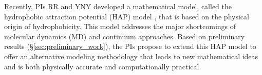 Recently, PIs RR and YNY developed a mathematical model, called the
hydrophobic attraction potential (HAP) model \cite{Fu2018_SIAM}, that is based
on the physical origin of hydrophobicity. This model addresses the major
shortcomings of molecular dynamics (MD) and continuum approaches. Based
on preliminary results (\S\ref{sec:preliminary_work}), the PIs propose to
extend this HAP model to offer an alternative modeling methodology that
leads to new mathematical ideas and is both physically accurate and
computationally practical.
%
%
%
%
%
